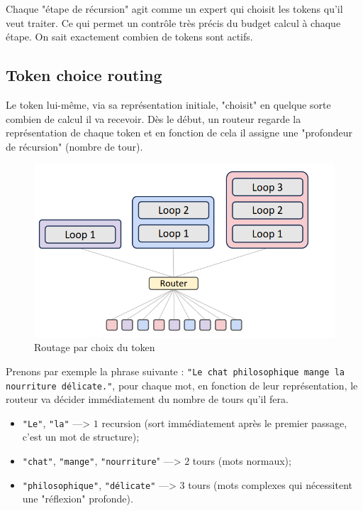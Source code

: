\documentclass{article}
\begin{document}
Chaque "étape de récursion" agit comme un expert qui choisit les tokens
qu'il veut traiter. Ce qui permet un contrôle très précis du budget calcul
à chaque étape. On sait exactement combien de tokens sont actifs.

\subsection{Token choice routing}
Le token lui-même, via sa représentation initiale, "choisit" en quelque sorte
combien de calcul il va recevoir. Dès le début, un routeur regarde
la représentation de chaque token et en fonction de cela il assigne
une "profondeur de récursion" (nombre de tour).
 
 \begin{figure}[h]
  \centering
  \includegraphics[scale=0.5]{images/token_choice_routing.png}
  \caption{Routage par choix du token \cite{bae2025mixtureofrecursionslearningdynamicrecursive}}
  \label{fig:token-choice-routing}
\end{figure}
 
 Prenons par exemple la phrase suivante :
 \texttt{"Le chat philosophique mange la nourriture délicate."}, pour chaque
 mot, en fonction de leur représentation, le routeur va décider immédiatement
 du nombre de tours qu'il fera.
 
 \begin{itemize}
  \item \texttt{"Le"}, \texttt{"la"} ---> $1$ recursion
  (sort immédiatement après le premier passage, c'est un mot de structure);
  \item \texttt{"chat"}, \texttt{"mange"}, \texttt{"nourriture}" ---> $2$ tours
  (mots normaux);
  \item \texttt{"philosophique"}, \texttt{"délicate"} ---> $3$ tours
  (mots complexes qui nécessitent une "réflexion" profonde).
 \end{itemize}
\end{document}
